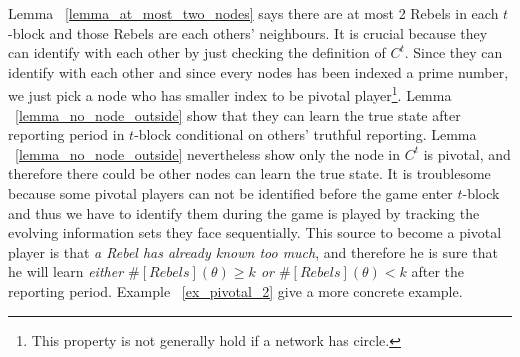 \documentclass[12pt,letter]{article}
\theoremstyle{definition}
\theoremstyle{remark}
\theoremstyle{claim}
\begin{document}
Lemma ~\ref{lemma_at_most_two_nodes} says there are at most 2 Rebels in each $t$-block and those Rebels are each others' neighbours. It is crucial because they can identify with each other by just checking the definition of $C^t$. Since they can identify with each other and since every nodes has been indexed a prime number, we just pick a node who has smaller index to be pivotal player\footnote{This property is not generally hold if a network has circle.}. Lemma ~\ref{lemma_no_node_outside} show that they can learn the true state after reporting period in $t$-block conditional on others' truthful reporting. Lemma ~\ref{lemma_no_node_outside} nevertheless show only the node in $C^t$ is pivotal, and therefore there could be other nodes can learn the true state. It is troublesome because some pivotal players can not be identified before the game enter $t$-block and thus we have to identify them during the game is played by tracking the evolving information sets they face sequentially. This source to become a pivotal player is that \textit{a Rebel has already known too much}, and therefore he is sure that he will learn \textit{either $\#[Rebels](\theta)\geq k$ or $\#[Rebels](\theta)< k$} after the reporting period. Example ~\ref{ex_pivotal_2} give a more concrete example.
\end{document}
